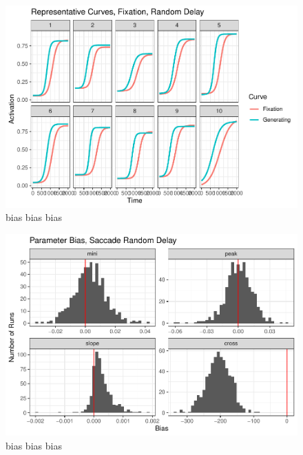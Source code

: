 \documentclass{article}
\begin{document}
\begin{figure}[h]
\centering
\includegraphics{fixation_random_pb_curves.pdf}
\caption{bias bias bias}
\label{fig:something_else2}
\end{figure}



\begin{figure}[h]
\centering
\includegraphics{saccade_random_par_bias.pdf}
\caption{bias bias bias}
\label{fig:saccade_random_par_bias}
\end{figure}
\end{document}

